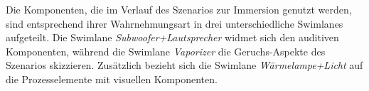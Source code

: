 Die Komponenten, die im Verlauf des Szenarios zur Immersion genutzt werden, sind entsprechend ihrer Wahrnehmungsart in drei unterschiedliche Swimlanes aufgeteilt. Die Swimlane \textit{Subwoofer+Lautsprecher} widmet sich den auditiven Komponenten, während die Swimlane \textit{Vaporizer} die Geruchs-Aspekte des Szenarios skizzieren. Zusätzlich bezieht sich die Swimlane \textit{Wärmelampe+Licht} auf die Prozesselemente mit visuellen Komponenten.

